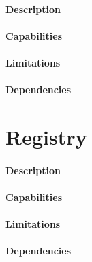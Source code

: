 \paragraph{Description}
\paragraph{Capabilities}
\paragraph{Limitations}
\paragraph{Dependencies}

\section{Registry} %
\label{sec:registry}

\paragraph{Description}
\paragraph{Capabilities}
\paragraph{Limitations}
\paragraph{Dependencies}
